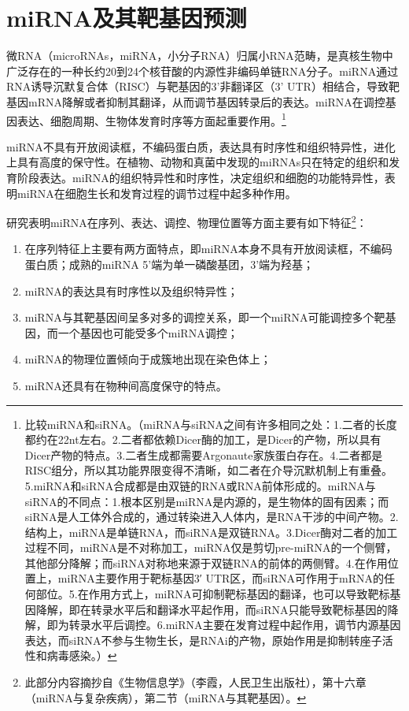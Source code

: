 \documentclass[11pt,a4paper,twoside]{book}
\begin{document}
\section{miRNA及其靶基因预测}
微RNA（microRNAs，miRNA，小分子RNA）归属小RNA范畴，是真核生物中广泛存在的一种长约20到24个核苷酸的内源性非编码单链RNA分子。miRNA通过RNA诱导沉默复合体（RISC）与靶基因的3'非翻译区（3' UTR）相结合，导致靶基因mRNA降解或者抑制其翻译，从而调节基因转录后的表达。miRNA在调控基因表达、细胞周期、生物体发育时序等方面起重要作用。\footnote{比较miRNA和siRNA。（miRNA与siRNA之间有许多相同之处：1.二者的长度都约在22nt左右。2.二者都依赖Dicer酶的加工，是Dicer的产物，所以具有Dicer产物的特点。3.二者生成都需要Argonaute家族蛋白存在。4.二者都是RISC组分，所以其功能界限变得不清晰，如二者在介导沉默机制上有重叠。5.miRNA和siRNA合成都是由双链的RNA或RNA前体形成的。miRNA与siRNA的不同点：1.根本区别是miRNA是内源的，是生物体的固有因素；而siRNA是人工体外合成的，通过转染进入人体内，是RNA干涉的中间产物。2.结构上，miRNA是单链RNA，而siRNA是双链RNA。3.Dicer酶对二者的加工过程不同，miRNA是不对称加工，miRNA仅是剪切pre-miRNA的一个侧臂，其他部分降解；而siRNA对称地来源于双链RNA的前体的两侧臂。4.在作用位置上，miRNA主要作用于靶标基因3′ UTR区，而siRNA可作用于mRNA的任何部位。5.在作用方式上，miRNA可抑制靶标基因的翻译，也可以导致靶标基因降解，即在转录水平后和翻译水平起作用，而siRNA只能导致靶标基因的降解，即为转录水平后调控。6.miRNA主要在发育过程中起作用，调节内源基因表达，而siRNA不参与生物生长，是RNAi的产物，原始作用是抑制转座子活性和病毒感染。）}

miRNA不具有开放阅读框，不编码蛋白质，表达具有时序性和组织特异性，进化上具有高度的保守性。在植物、动物和真菌中发现的miRNAs只在特定的组织和发育阶段表达。miRNA的组织特异性和时序性，决定组织和细胞的功能特异性，表明miRNA在细胞生长和发育过程的调节过程中起多种作用。

研究表明miRNA在序列、表达、调控、物理位置等方面主要有如下特征\footnote{此部分内容摘抄自《生物信息学》（李霞，人民卫生出版社），第十六章（miRNA与复杂疾病），第二节（miRNA与其靶基因）。}：
\begin{enumerate}
  \item 在序列特征上主要有两方面特点，即miRNA本身不具有开放阅读框，不编码蛋白质；成熟的miRNA 5'端为单一磷酸基团，3'端为羟基；
  \item miRNA的表达具有时序性以及组织特异性；
  \item miRNA与其靶基因间呈多对多的调控关系，即一个miRNA可能调控多个靶基因，而一个基因也可能受多个miRNA调控；
  \item miRNA的物理位置倾向于成簇地出现在染色体上；
  \item miRNA还具有在物种间高度保守的特点。
\end{enumerate}
\end{document}
